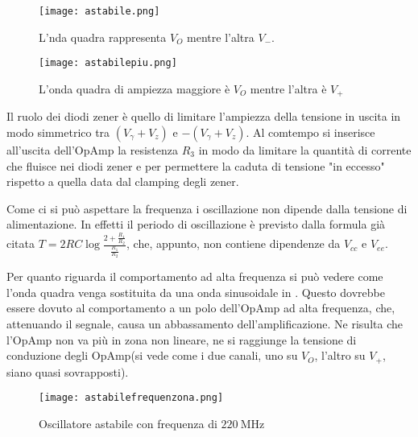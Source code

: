\begin{figure}[h]
	\centering
	\texttt{[image: astabile.png]}
	\caption{L'nda quadra rappresenta $V_O$ mentre l'altra $V_-$.}
	\label{f:astabile}
\end{figure}

\begin{figure}[h]
	\centering
	\texttt{[image: astabilepiu.png]}
	\caption{L'onda quadra di ampiezza maggiore è $V_O$ mentre l'altra è $V_+$}
	\label{f:astabile+}
\end{figure}

Il ruolo dei diodi zener è quello di limitare l'ampiezza della tensione in uscita in modo simmetrico tra $(V_\gamma + V_z)$ e $-(V_\gamma + V_z)$. Al comtempo si inserisce all'uscita dell'OpAmp la resistenza $R_3$ in modo da limitare la quantità di corrente che fluisce nei diodi zener e per permettere la caduta di tensione "in eccesso" rispetto a quella data dal clamping degli zener.


Come ci si può aspettare la frequenza i oscillazione non dipende dalla tensione di alimentazione. In effetti il periodo di oscillazione è previsto dalla formula già citata $T=2RC\log\frac{2+\frac{R_1}{R_2}}{\frac{R_1}{R_2}}$, che, appunto, non contiene dipendenze da $V_{cc}$ e $V_{ee}$.


Per quanto riguarda il comportamento ad alta frequenza si può vedere come l'onda quadra venga sostituita da una onda sinusoidale in . Questo dovrebbe essere dovuto al comportamento a un polo dell'OpAmp ad alta frequenza, che, attenuando il segnale, causa un abbassamento dell'amplificazione. Ne risulta che l'OpAmp non va più in zona non lineare, ne si raggiunge la tensione di conduzione degli OpAmp(si vede come i due canali, uno su $V_O$, l'altro su $V_+$, siano quasi sovrapposti).

\begin{figure}[h]
	\centering
	\texttt{[image: astabilefrequenzona.png]}
	\caption{Oscillatore astabile con frequenza di $\SI{220}{\mega\Hz}$}
	\label{f:freqzona}
\end{figure}
